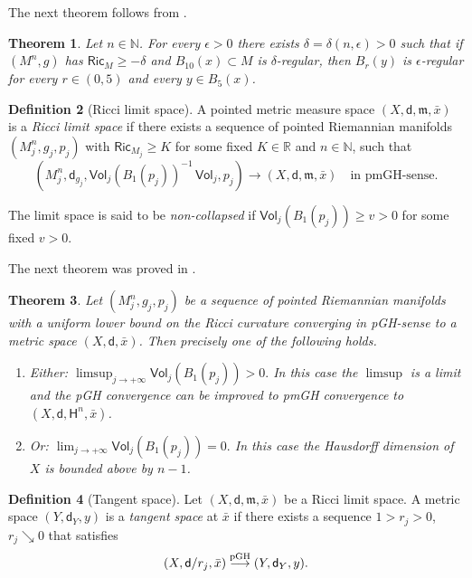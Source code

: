 \documentclass[10pt]{article}
\newtheorem{thm}{Theorem}[section]
\theoremstyle{definition}
\newtheorem{definition}[thm]{Definition}
\newcommand{\bb}[1]{\mathbb{#1}}
\newcommand{\ssf}[1]{\mathsf{#1}}
\newcommand{\Ric}{\mathsf{Ric}}
\newcommand{\aH}{\mathsf{H}}
\newcommand{\sd}{\mathsf{d}}
\newcommand{\m}{\mathfrak{m}}
\begin{document}
The next theorem follows from \cite{Colding1,ColdingConv,ChCo1}. 


\begin{thm} \label{T1} Let $n \in \bb{N}$.
    For every $\epsilon>0$ there exists $\delta=\delta(n, \epsilon)>0$ such that if $(M^n,g)$ has $\Ric_M \geq -\delta$ and $B_{10}(x) \subset M$ is $\delta$-regular, then $B_r(y)$ is $\epsilon$-regular for every $r \in (0,5)$ and every $y \in B_5(x)$.
\end{thm}

\begin{definition}[Ricci limit space]
A pointed metric measure space $(X,\sd,\m,\bar{x})$ is a \emph{Ricci limit space} if there exists a sequence of pointed Riemannian manifolds $(M^n_j,g_j,p_j)$ with $\Ric_{M_j} \geq K$ for some fixed $K \in \bb{R}$ and $n \in \bb{N}$, such that $$(M^n_j,\sd_{g_j}, \ssf{Vol}_j(B_1(p_j))^{-1}\, \ssf{Vol}_j,p_j) \longrightarrow (X,\sd, \m, \bar{x}) \quad \text{in pmGH-sense.}
$$

The limit space is said to be \emph{non-collapsed} if $\ssf{Vol}_j(B_1(p_j)) \geq v>0$ for some fixed $v>0$.
\end{definition}

The next theorem was proved in  \cite{ColdingConv, Colding1}.

\begin{thm} \label{T3}
    Let $(M^n_j,g_j,p_j)$ be a sequence of pointed Riemannian manifolds with a uniform lower bound on the Ricci curvature converging in pGH-sense to a metric space $(X,\sd,\bar{x})$. Then precisely one of the following holds.
    \begin{enumerate}
        \item Either:
        $
        \limsup_{j \to + \infty} \ssf{Vol}_j(B_1(p_j))>0.
        $
        In this case the $\limsup$ is a limit and the pGH convergence can be improved to pmGH convergence to $(X,\sd,\aH^n,\bar{x})$.
        \item  Or:
        $
        \lim_{j \to + \infty} \ssf{Vol}_j(B_1(p_j))=0.
        $
        In this case the Hausdorff dimension of $X$ is bounded above by $n-1$.
    \end{enumerate}
\end{thm}

\begin{definition}[Tangent space]
    Let $(X,\sd,\m,\bar{x})$ be a Ricci limit space. A metric space $(Y,\sd_Y,y)$ is a \emph{tangent space} at $\bar{x}$ if there exists a sequence $1 > r_j > 0$, $r_j \searrow 0$ that satisfies 
    $$
    (X, \sd / r_j, \bar{x}) \stackrel{\rm{pGH}}{\longrightarrow} (Y, \sd_Y, y).
    $$
\end{definition}
\end{document}

